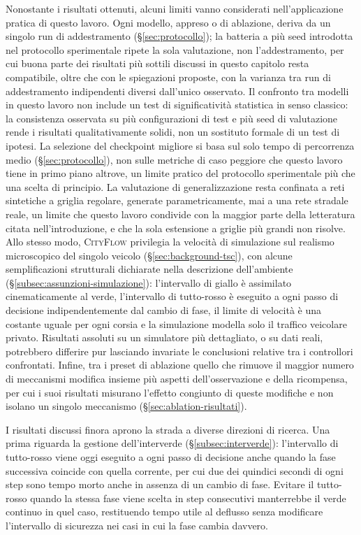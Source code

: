Nonostante i risultati ottenuti, alcuni limiti vanno considerati
nell'applicazione pratica di questo lavoro. Ogni modello, appreso o di
ablazione, deriva da un singolo run di addestramento
(§\ref{sec:protocollo}); la batteria a più seed introdotta nel protocollo
sperimentale ripete la sola valutazione, non l'addestramento, per cui
buona parte dei risultati più sottili discussi in questo capitolo resta
compatibile, oltre che con le spiegazioni proposte, con la varianza tra
run di addestramento indipendenti diversi dall'unico osservato. Il
confronto tra modelli in questo lavoro non include un test di
significatività statistica in senso classico: la consistenza osservata
su più configurazioni di test e più seed di valutazione rende i
risultati qualitativamente solidi, non un sostituto formale di un test
di ipotesi. La selezione del checkpoint migliore si basa sul solo tempo
di percorrenza medio (§\ref{sec:protocollo}), non sulle metriche di caso
peggiore che questo lavoro tiene in primo piano altrove, un limite
pratico del protocollo sperimentale più che una scelta di principio. La
valutazione di generalizzazione resta
confinata a reti sintetiche a griglia regolare, generate
parametricamente, mai a una rete stradale reale, un limite che questo
lavoro condivide con la maggior parte della letteratura citata
nell'introduzione, e che la sola estensione a griglie più grandi non
risolve. Allo stesso modo, \textsc{CityFlow} privilegia la velocità di
simulazione sul realismo microscopico del singolo veicolo
(§\ref{sec:background-tsc}), con alcune semplificazioni strutturali
dichiarate nella descrizione dell'ambiente
(§\ref{subsec:assunzioni-simulazione}): l'intervallo di giallo è
assimilato cinematicamente al verde, l'intervallo di tutto-rosso è
eseguito a ogni passo di decisione indipendentemente dal cambio di fase,
il limite di velocità è una costante uguale per ogni corsia e la
simulazione modella solo il traffico veicolare privato. Risultati
assoluti su un simulatore più dettagliato, o su dati reali, potrebbero
differire pur lasciando invariate le conclusioni relative tra i
controllori confrontati. Infine, tra i preset di ablazione quello che
rimuove il maggior numero di meccanismi modifica insieme più aspetti
dell'osservazione e della ricompensa, per cui i suoi risultati misurano
l'effetto congiunto di queste modifiche e non isolano un singolo
meccanismo (§\ref{sec:ablation-risultati}).

I risultati discussi finora aprono la strada a diverse direzioni di
ricerca. Una prima riguarda la gestione dell'interverde
(§\ref{subsec:interverde}): l'intervallo di tutto-rosso viene oggi
eseguito a ogni passo di decisione anche quando la fase successiva
coincide con quella corrente, per cui due dei quindici secondi di ogni
step sono tempo morto anche in assenza di un cambio di fase. Evitare il
tutto-rosso quando la stessa fase viene scelta in step consecutivi
manterrebbe il verde continuo in quel caso, restituendo tempo utile al
deflusso senza modificare l'intervallo di sicurezza nei casi in cui la
fase cambia davvero.

